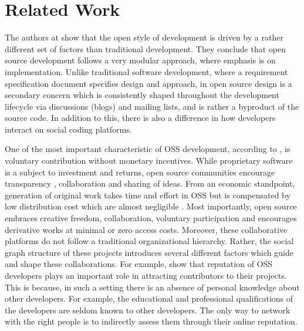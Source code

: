 
\section{Related Work}
\label{sec:related}

The authors at \cite{LlanosC12} show that the open style of development is driven by a rather different set of factors than traditional development. They conclude that open source development follows a very modular approach, where emphasis is on implementation. Unlike traditional software development, where a requirement specification document specifies design and approach, in open source design is a secondary concern which is consistently shaped throughout the development lifecycle via discussions (blogs) and mailing lists, and is rather a byproduct of the source code. In addition to this, there is also a difference in how developers interact on social coding platforms.

One of the most important characteristic of OSS development, according to \cite{Hippel2003}, is voluntary contribution without monetary incentives. While proprietary software is a subject to investment and returns, open source communities encourage transparency \cite{Dabbish2012}, collaboration and sharing of ideas. From an economic standpoint, generation of original work takes time and effort in OSS but is compensated by low distribution cost which are almost negligible \cite{Lerner2002}. Most importantly, open source embraces creative freedom, collaboration, voluntary participation and encourages derivative works at minimal or zero access costs. Moreover, these collaborative platforms do not follow a traditional organizational hierarchy. Rather, the social graph structure of these projects introduces several different factors which guide and shape these collaborations. For example, \cite{Lerner2002} \cite{Raymond1998} show that reputation of OSS developers plays an important role in attracting contributors to their projects. This is because, in such a setting there is an absence of personal knowledge about other developers. For example, the educational and professional qualifications of the developers are seldom known to other developers. The only way to network with the right people is to indirectly assess them through their online reputation.

